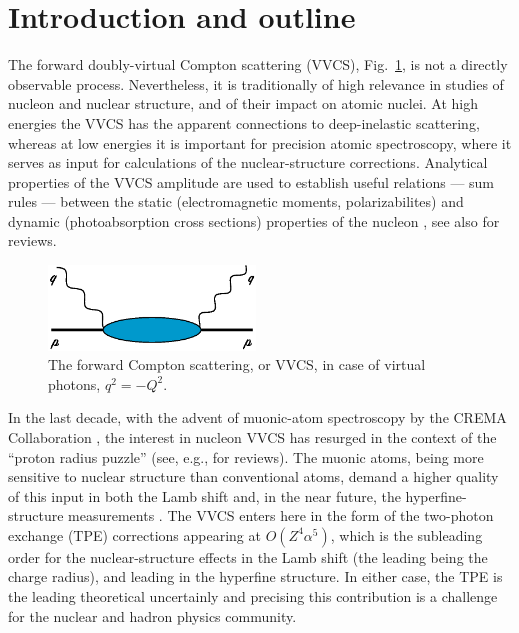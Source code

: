 \documentclass[12pt,preprint,tightenlines,
showpacs,preprintnumbers,amsmath,amssymb,
a4paper,nofootinbib]{revtex4-1}
\def\Figref#1{Fig.~\ref{fig:#1}}
\def\al{\alpha}
\begin{document}
\tableofcontents

\newpage
\section{Introduction and outline}


The forward doubly-virtual 
Compton scattering (VVCS), \Figref{CSgeneric}, is not a directly observable process. Nevertheless, it 
is traditionally of high relevance in studies
of nucleon and nuclear structure, and of their impact on atomic nuclei. At high energies
the VVCS has the  apparent connections to deep-inelastic scattering, whereas 
at low energies it is important for precision atomic spectroscopy, where it serves as input for calculations of the nuclear-structure corrections. Analytical properties of the VVCS amplitude
are used to establish useful relations --- sum rules ---
between the static 
(electromagnetic moments, polarizabilites) 
and dynamic (photoabsorption cross sections) properties of the nucleon \cite{GellMann:1954db,Burkhardt:1970ti,Schwinger:1975uq,Bernabeu:1974mb,Lvov:1998vg},
see also \cite{Drechsel:2002ar,Kuhn:2008sy,Holstein:2013kia,Hagelstein:2015egb,Pascalutsa:2018ced,Pasquini:2018wbl} for reviews. 

\begin{figure}[bht]
\centering
       \includegraphics[width=5.5cm]{frwCSgeneric.eps}
\caption{The forward Compton scattering, or VVCS, in case of virtual photons, $q^2=-Q^2$.
  \label{fig:CSgeneric}}
\end{figure}

In the last decade, with the advent of muonic-atom spectroscopy
by the CREMA Collaboration \cite{Pohl:2010zza,Antognini:1900ns,Pohl1:2016xoo},
the interest in nucleon VVCS has resurged in the context of 
the  ``proton radius puzzle'' (see, e.g.,  \cite{Pohl:2013yb,Carlson:2015jba} for reviews).  
The muonic atoms, being more sensitive to nuclear structure than
conventional atoms, demand a higher quality of this input
in both the Lamb shift \cite{Pohl:2010zza,Antognini:1900ns} and, in the near future, the hyperfine-structure measurements  \cite{Pohl:2016xsr,Bakalov:2015xya,Kanda:2018oay}. The VVCS  enters here in the form of the two-photon exchange (TPE) corrections appearing at $O(Z^4\al^5)$, which is the subleading order for the nuclear-structure effects in the Lamb shift (the leading  being the  charge radius), and leading in the hyperfine structure. In either case, the TPE is the leading theoretical uncertainly and precising this contribution is a challenge for the nuclear and hadron
physics community.
\end{document}
